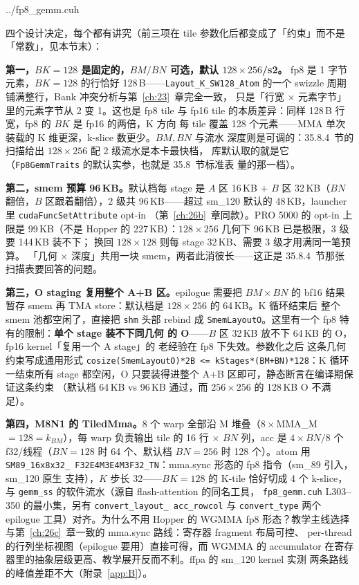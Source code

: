 \begin{lstinputlisting}[linerange={366-400},firstnumber=auto,
  title={fp8\_gemm.cuh L366-400（Fp8GemmTraits：tile/smem/MMA 全参数）}]{../fp8_gemm.cuh}
\end{lstinputlisting}

四个设计决定，每个都有讲究（前三项在 tile 参数化后都变成了「约束」而不是
「常数」，见本节末）：

\textbf{第一，$BK{=}128$ 是固定的，$BM/BN$ 可选，默认 $128\times256$/s2。}
fp8 是 1 字节元素，$BK{=}128$ 的行恰好 128\,B——\texttt{Layout\_K\_SW128\_Atom}
的一个 swizzle 周期铺满整行，Bank 冲突分析与第~\ref{ch:23}~章完全一致，
只是「行宽 $\times$ 元素字节」里的元素字节从 2 变 1。这也是 fp8 tile 与
fp16 tile 的本质差异：同样 128\,B 行宽，fp8 的 $BK$ 是 fp16 的两倍，K 方向
每 tile 覆盖 128 个元素——MMA 单次装载的 K 维更深，k-slice 数更少。$BM,BN$ 与流水
深度则是可调的：35.8.4~节的扫描给出 $128\times256$ 配 2 级流水是本卡最快档，
库默认取的就是它（\texttt{Fp8GemmTraits} 的默认实参，也就是 35.8~节标准表
量的那一档）。

\textbf{第二，smem 预算 96\,KB。}默认档每 stage 是 $A$ 区 16\,KB + $B$ 区
32\,KB（$BN$ 翻倍，$B$ 区跟着翻倍），2 级共 96\,KB——超过 sm\_120 默认的
48\,KB，launcher 里 \texttt{cudaFuncSetAttribute} opt-in
（第~\ref{ch:26b}~章同款）。PRO 5000 的 opt-in 上限是 99\,KB（不是 Hopper 的
227\,KB）：$128\times256$ 几何下 96\,KB 已是极限，3 级要 144\,KB 装不下；
换回 $128\times128$ 则每 stage 32\,KB、需要 3 级才用满同一笔预算。
「几何 $\times$ 深度」共用一块 smem，两者此消彼长——这正是 35.8.4~节那张
扫描表要回答的问题。

\textbf{第三，O staging 复用整个 A+B 区。}epilogue 需要把
$BM\times BN$ 的 bf16 结果暂存 smem 再 TMA store：默认档是
$128\times256$ 的 64\,KB。K 循环结束后
整个 smem 池都空闲了，直接把 \texttt{shm} 头部 rebind 成
\texttt{SmemLayoutO}。这里有一个 fp8 特有的限制：\textbf{单个 stage 装不下同几何
的 O}——$B$ 区 32\,KB 放不下 64\,KB 的 O，fp16 kernel「复用一个 A stage」的
老经验在 fp8 下失效。参数化之后
这条几何约束写成通用形式
\texttt{cosize(SmemLayoutO)*2B <= kStages*(BM+BN)*128}：K 循环一结束所有
stage 都空闲，O 只要装得进整个 A+B 区即可，静态断言在编译期保证这条约束
（默认档 64\,KB vs 96\,KB 通过，而 $256\times256$ 的 128\,KB O 不满足）。

\textbf{第四，M8N1 的 TiledMma。}8 个 warp 全部沿 M 堆叠（$8\times$MMA\_M
$=128=k_{BM}$），每 warp 负责输出 tile 的 16 行 $\times$ $BN$ 列，acc 是
$4\times BN/8$ 个 f32/线程（$BN{=}128$ 时 64 个、默认档 $BN{=}256$ 时
128 个）。atom 用 \texttt{SM89\_16x8x32\_
F32E4M3E4M3F32\_TN}：mma.sync 形态的 fp8 指令（sm\_89 引入，sm\_120 原生
支持），$K$ 步长 32——$BK{=}128$ 的 K-tile 恰好切成 4 个 k-slice，与
\texttt{gemm\_ss} 的软件流水（源自 flash-attention 的同名工具，
\texttt{fp8\_gemm.cuh} L303--350 的最小集，另有 \texttt{convert\_layout\_
acc\_rowcol} 与 \texttt{convert\_type} 两个 epilogue 工具）对齐。为什么不用
Hopper 的 WGMMA fp8 形态？教学主线选择
与第~\ref{ch:26c}~章一致的 mma.sync 路线：寄存器 fragment 布局可控、
per-thread 的行列坐标视图（epilogue 要用）直接可得，而 WGMMA 的 accumulator
在寄存器里的抽象层级更高、教学展开反而不利。ffpa 的 sm\_120 kernel 实测
两条路线的峰值差距不大（附录~\ref{app:B}）。

